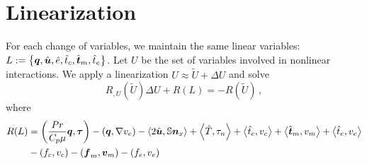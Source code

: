 \documentclass{article}
\begin{document}
\section*{Linearization}
For each change of variables, we maintain the same linear variables: $L:=\left\{ \boldsymbol q,\hat{\boldsymbol u},\hat e,\hat t_c,\hat{\boldsymbol t}_m,\hat t_e \right\}$.
Let $U$ be the set of variables involved in nonlinear interactions.
We apply a linearization $U\approx\tilde U+\Delta U$ and solve
\begin{equation*}
	R_{,U}(\tilde U)\Delta U+R(L)=-R(\tilde U)\,,
\end{equation*}
where
\begin{align*}
R(L)&=
\left( \frac{Pr}{C_p\mu}\boldsymbol q,\boldsymbol\tau \right)
-\left( \boldsymbol q,\nabla v_e \right)
-\left\langle 2\hat{\boldsymbol u},\mathbb{S}\boldsymbol n_x \right\rangle
+\left\langle \hat T,\tau_n \right\rangle
+\left\langle \hat t_c,v_c \right\rangle
+\left\langle \hat {\boldsymbol t}_m,v_m \right\rangle
+\left\langle \hat t_e,v_e \right\rangle\\
&-\left( f_c,v_c \right)
-\left( \boldsymbol f_m,\boldsymbol v_m \right)
-\left( f_e,v_e \right)
\end{align*}
\end{document}
